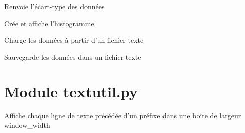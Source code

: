 \documentclass[letterpaper,10pt,french]{sphinxmanual}
\begin{document}
\begin{fulllineitems}
\begin{fulllineitems}
\end{fulllineitems}


\begin{fulllineitems}
\label{\detokenize{index:stats.Stats.getSigma}}
Renvoie l’écart-type des données

\end{fulllineitems}


\begin{fulllineitems}
\label{\detokenize{index:stats.Stats.histogram}}
Crée et affiche l’histogramme

\end{fulllineitems}


\begin{fulllineitems}
\label{\detokenize{index:stats.Stats.loadData}}
Charge les données à partir d’un fichier texte

\end{fulllineitems}


\begin{fulllineitems}
\label{\detokenize{index:stats.Stats.saveData}}
Sauvegarde les données dans un fichier texte

\end{fulllineitems}


\end{fulllineitems}



\section{Module textutil.py}
\label{\detokenize{index:module-textutil-py}}\label{\detokenize{index:module-textutil}}

\begin{fulllineitems}
\label{\detokenize{index:textutil.boxed}}
Affiche chaque ligne de texte précédée d’un préfixe
dans une boîte de largeur window\_width

\end{fulllineitems}
\end{document}
